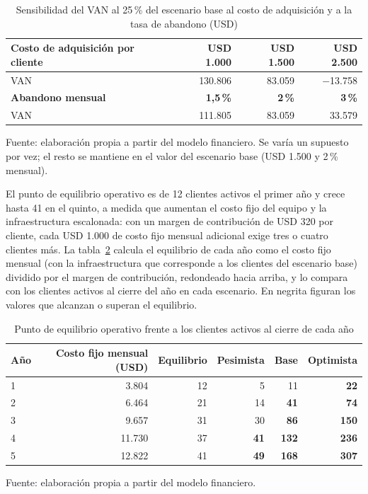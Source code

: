 \begin{table}[h]
\centering
\caption{Sensibilidad del VAN al 25\,\% del escenario base al costo de adquisición y a la tasa de abandono (USD)}
\label{tab:sensibilidad-cac}
\begin{tabular}{lrrr}
\hline
\textbf{Costo de adquisición por cliente} & \textbf{USD 1.000} & \textbf{USD 1.500} & \textbf{USD 2.500} \\
\hline
VAN & 130.806 & 83.059 & $-$13.758 \\
\hline
\textbf{Abandono mensual} & \textbf{1,5\,\%} & \textbf{2\,\%} & \textbf{3\,\%} \\
\hline
VAN & 111.805 & 83.059 & 33.579 \\
\hline
\end{tabular}\par
{\small Fuente: elaboración propia a partir del modelo financiero. Se varía un supuesto por vez; el resto se mantiene en el valor del escenario base (USD 1.500 y 2\,\% mensual).\par}
\end{table}
\FloatBarrier

El punto de equilibrio operativo es de 12 clientes activos el primer año y crece hasta 41 en el
quinto, a medida que aumentan el costo fijo del equipo y la infraestructura escalonada: con un margen de contribución de USD 320 por
cliente, cada USD 1.000 de costo fijo mensual adicional exige tres o cuatro clientes más. La
tabla~\ref{tab:equilibrio-fin} calcula el equilibrio de cada año como el costo fijo mensual (con la
infraestructura que corresponde a los clientes del escenario base) dividido
por el margen de contribución, redondeado hacia arriba, y lo compara con los clientes activos al
cierre del año en cada escenario. En negrita figuran los valores que alcanzan o superan el
equilibrio.

\begin{table}[h]
\centering
\caption{Punto de equilibrio operativo frente a los clientes activos al cierre de cada año}
\label{tab:equilibrio-fin}
\begin{tabular}{lrrrrr}
\hline
\textbf{Año} & \textbf{Costo fijo mensual (USD)} & \textbf{Equilibrio} & \textbf{Pesimista} & \textbf{Base} & \textbf{Optimista} \\
\hline
1 & 3.804 & 12 & 5 & 11 & \textbf{22} \\
2 & 6.464 & 21 & 14 & \textbf{41} & \textbf{74} \\
3 & 9.657 & 31 & 30 & \textbf{86} & \textbf{150} \\
4 & 11.730 & 37 & \textbf{41} & \textbf{132} & \textbf{236} \\
5 & 12.822 & 41 & \textbf{49} & \textbf{168} & \textbf{307} \\
\hline
\end{tabular}\par
{\small Fuente: elaboración propia a partir del modelo financiero.\par}
\end{table}
\FloatBarrier

